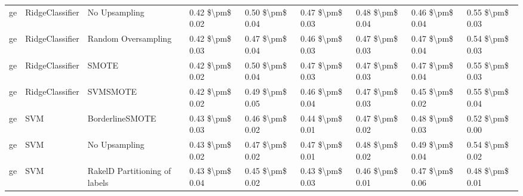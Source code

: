 \begin{tabular}{lllllllll}
      ge &                 RidgeClassifier &                 No Upsampling & 0.42 \$\textbackslash pm\$ 0.02 &           0.50 \$\textbackslash pm\$ 0.04 &       0.47 \$\textbackslash pm\$ 0.03 &        0.48 \$\textbackslash pm\$ 0.04 &                         0.46 \$\textbackslash pm\$ 0.04 &     0.55 \$\textbackslash pm\$ 0.03 \\
      ge &                 RidgeClassifier &           Random Oversampling & 0.42 \$\textbackslash pm\$ 0.03 &           0.47 \$\textbackslash pm\$ 0.04 &       0.46 \$\textbackslash pm\$ 0.03 &        0.47 \$\textbackslash pm\$ 0.03 &                         0.47 \$\textbackslash pm\$ 0.04 &     0.54 \$\textbackslash pm\$ 0.03 \\
      ge &                 RidgeClassifier &                         SMOTE & 0.42 \$\textbackslash pm\$ 0.02 &           0.50 \$\textbackslash pm\$ 0.04 &       0.47 \$\textbackslash pm\$ 0.03 &        0.47 \$\textbackslash pm\$ 0.03 &                         0.47 \$\textbackslash pm\$ 0.04 &     0.55 \$\textbackslash pm\$ 0.03 \\
      ge &                 RidgeClassifier &                      SVMSMOTE & 0.42 \$\textbackslash pm\$ 0.02 &           0.49 \$\textbackslash pm\$ 0.05 &       0.46 \$\textbackslash pm\$ 0.04 &        0.47 \$\textbackslash pm\$ 0.03 &                         0.45 \$\textbackslash pm\$ 0.02 &     0.55 \$\textbackslash pm\$ 0.04 \\
      ge &                             SVM &               BorderlineSMOTE & 0.43 \$\textbackslash pm\$ 0.03 &           0.46 \$\textbackslash pm\$ 0.02 &       0.44 \$\textbackslash pm\$ 0.01 &        0.47 \$\textbackslash pm\$ 0.02 &                         0.48 \$\textbackslash pm\$ 0.03 &     0.52 \$\textbackslash pm\$ 0.00 \\
      ge &                             SVM &                 No Upsampling & 0.43 \$\textbackslash pm\$ 0.02 &           0.47 \$\textbackslash pm\$ 0.02 &       0.47 \$\textbackslash pm\$ 0.01 &        0.48 \$\textbackslash pm\$ 0.02 &                         0.49 \$\textbackslash pm\$ 0.04 &     0.54 \$\textbackslash pm\$ 0.02 \\
      ge &                             SVM & RakelD Partitioning of labels & 0.43 \$\textbackslash pm\$ 0.04 &           0.45 \$\textbackslash pm\$ 0.02 &       0.43 \$\textbackslash pm\$ 0.03 &        0.46 \$\textbackslash pm\$ 0.01 &                         0.47 \$\textbackslash pm\$ 0.06 &     0.48 \$\textbackslash pm\$ 0.01 \\

\end{tabular}
